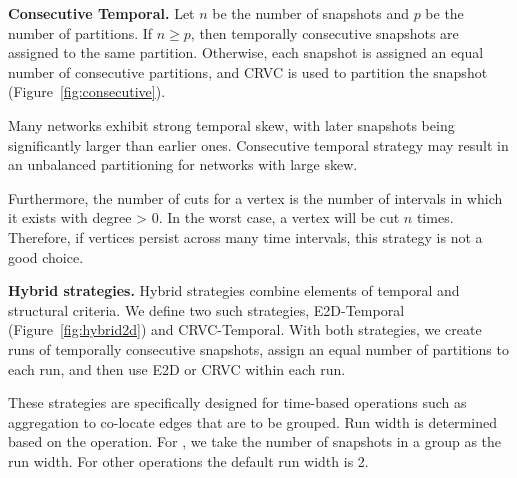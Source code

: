 {\bf Consecutive Temporal.}  Let $n$ be the number of snapshots and
$p$ be the number of partitions.  If $n \geq p$, then temporally
consecutive snapshots are assigned to the same partition.  Otherwise,
each snapshot is assigned an equal number of consecutive partitions,
and CRVC is used to partition the snapshot
(Figure~\ref{fig:consecutive}).


Many networks exhibit strong temporal skew, with later snapshots being
significantly larger than earlier ones.  Consecutive temporal strategy
may result in an unbalanced partitioning for networks with large skew.

Furthermore, the number of cuts for a vertex is the number of
intervals in which it exists with degree > 0.  In the worst case, a
vertex will be cut $n$ times.  Therefore, if vertices persist across
many time intervals, this strategy is not a good choice.


{\bf Hybrid strategies.} Hybrid strategies combine elements of
temporal and structural criteria.  We define two such strategies,
E2D-Temporal (Figure~\ref{fig:hybrid2d}) and CRVC-Temporal.  With both
strategies, we create runs of temporally consecutive snapshots, assign
an equal number of partitions to each run, and then use E2D or CRVC
within each run.

These strategies are specifically designed for time-based operations
such as aggregation to co-locate edges that are to be grouped.  Run
width is determined based on the operation.  For , we
take the number of snapshots in a group as the run width.  For other
operations the default run width is 2.

